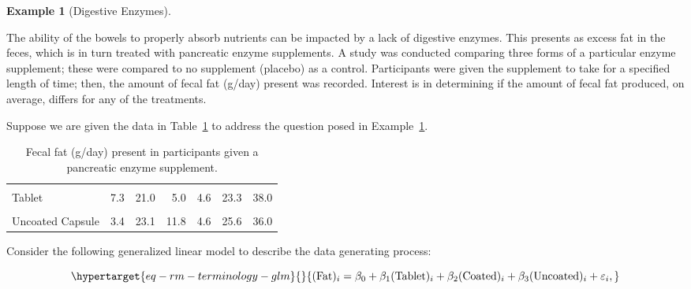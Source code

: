 \documentclass[
  letterpaper,
  DIV=11,
  numbers=noendperiod]{scrreprt}
\theoremstyle{definition}
\newtheorem{example}{Example}[chapter]
\theoremstyle{definition}
\theoremstyle{remark}
\begin{document}
\begin{example}[Digestive
Enzymes]\protect\hypertarget{exm-rm-enzyme}{}\label{exm-rm-enzyme}

The ability of the bowels to properly absorb nutrients can be impacted
by a lack of digestive enzymes. This presents as excess fat in the
feces, which is in turn treated with pancreatic enzyme supplements. A
study was conducted comparing three forms of a particular enzyme
supplement; these were compared to no supplement (placebo) as a control.
Participants were given the supplement to take for a specified length of
time; then, the amount of fecal fat (g/day) present was recorded.
Interest is in determining if the amount of fecal fat produced, on
average, differs for any of the treatments.

\end{example}

Suppose we are given the data in Table~\ref{tbl-rm-enzyme-data-table} to
address the question posed in Example~\ref{exm-rm-enzyme}.

\hypertarget{tbl-rm-enzyme-data-table}{}
\begin{table}
\caption{\label{tbl-rm-enzyme-data-table}Fecal fat (g/day) present in participants given a pancreatic enzyme
supplement. }\tabularnewline

\centering
\begin{tabular}[t]{lrrrrrr}
\toprule
\cellcolor{gray!6}{Placebo} & \cellcolor{gray!6}{44.5} & \cellcolor{gray!6}{33.0} & \cellcolor{gray!6}{19.1} & \cellcolor{gray!6}{9.4} & \cellcolor{gray!6}{71.3} & \cellcolor{gray!6}{51.2}\\
Tablet & 7.3 & 21.0 & 5.0 & 4.6 & 23.3 & 38.0\\
\cellcolor{gray!6}{Coated Capsule} & \cellcolor{gray!6}{12.4} & \cellcolor{gray!6}{25.6} & \cellcolor{gray!6}{22.0} & \cellcolor{gray!6}{5.8} & \cellcolor{gray!6}{68.2} & \cellcolor{gray!6}{52.6}\\
Uncoated Capsule & 3.4 & 23.1 & 11.8 & 4.6 & 25.6 & 36.0\\
\bottomrule
\end{tabular}
\end{table}

Consider the following generalized linear model to describe the data
generating process:

\begin{equation}\protect\hypertarget{eq-rm-terminology-glm}{}{(\text{Fat})_i = \beta_0 + \beta_1 (\text{Tablet})_i + \beta_2 (\text{Coated})_i + \beta_3 (\text{Uncoated})_i + \varepsilon_i,}\label{eq-rm-terminology-glm}\end{equation}
\end{document}
